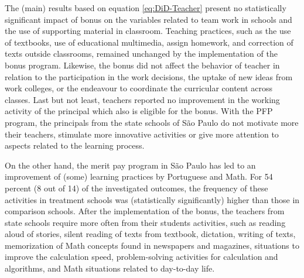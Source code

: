 \documentclass[a4paper, 12pt]{article}
\begin{document}
\justify


The (main) results based on equation \eqref{eq:DiD-Teacher} present no statistically significant impact of bonus on the variables related to team work in schools and the use of supporting material in classroom. Teaching practices, such as the use of textbooks, use of educational multimedia, assign homework, and correction of texts outside classrooms, remained unchanged by the implementation of the bonus program. Likewise, the bonus did not affect the behavior of teacher in relation to the participation in the work decisions, the uptake of new ideas from work colleges, or the endeavour to coordinate the curricular content across classes. Last but not least, teachers reported no improvement in the working activity of the principal \textemdash which also is eligible for the bonus. With the PFP program, the principals from the state schools of São Paulo do not motivate more their teachers, stimulate more innovative activities or give more attention to aspects related to the learning process.

On the other hand, the merit pay program in São Paulo has led to an improvement of (some) learning practices by Portuguese and Math. For 54 percent (8 out of 14) of the investigated outcomes, the frequency of these activities in treatment schools was (statistically significantly) higher than those in comparison schools. After the implementation of the bonus, the teachers from state schools require more often from their students activities, such as reading aloud of stories, silent reading of texts from textbook, dictation, writing of texts, memorization of Math concepts found in newspapers and magazines, situations to improve the calculation speed, problem-solving activities for calculation and algorithms, and Math situations related to day-to-day life.
\end{document}
